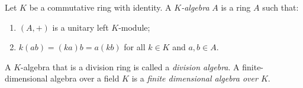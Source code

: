Let $K$ be a commutative ring with identity. A \emph{$K$-algebra} $A$ is a ring $A$ such that:
\begin{enumerate}
\item[(i)] $(A,+)$ is a unitary left $K$-module;
\item[(ii)] $k(ab) = (ka)b = a(kb)$ for all $k \in K$ and $a,b \in A$.
\end{enumerate}
A $K$-algebra that is a division ring is called a \emph{division algebra}. A finite-dimensional algebra over a field $K$ is a \emph{finite dimensional algebra over $K$}.
